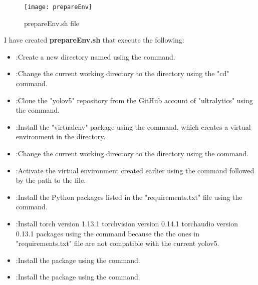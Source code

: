 \begin{itemize}
\begin{figure}[h]
       \centering

        \texttt{[image: prepareEnv]}
   
        \caption{prepareEnv.sh file}
        \label{fig:prepareEnv.sh file}

    \end{figure}
\FloatBarrier
I have created \textbf{prepareEnv.sh} that execute the following:
\begin{itemize}
    \item  {}:Create a new directory named   using the   command.
    \item  {}:Change the current working directory to the  directory using the "cd" command.
    \item  {}:Clone the "yolov5" repository from the GitHub account of "ultralytics" using the   command.
    \item  {}:Install the "virtualenv" package using the  command, which creates a virtual environment in the  directory.
    \item  {}:Change the current working directory to the directory using the  command.
    \item  {}:Activate the virtual environment created earlier using the  command followed by the path to the  file.
    \item  {}:Install the Python packages listed in the "requirements.txt" file using the  command.
    \item  {}:Install  torch version 1.13.1 torchvision version 0.14.1 torchaudio version 0.13.1 packages using the  command because the the ones in "requirements.txt" file are not compatible with the current yolov5.
    \item  {}:Install the  package using the  command.
    \item  {}:Install the  package using the  command.

\end{itemize}
\end{itemize}
